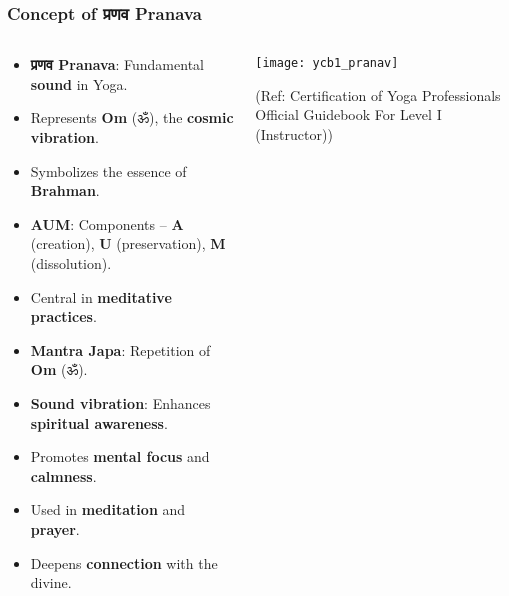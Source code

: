 \begin{frame}[fragile]\frametitle{Concept of प्रणव Pranava}
\begin{columns}
    \begin{column}[T]{0.7\linewidth}
      \begin{itemize}
        \item \textbf{प्रणव Pranava}: Fundamental \textbf{sound} in Yoga.
        \item Represents \textbf{Om} (ॐ), the \textbf{cosmic vibration}.
        \item Symbolizes the essence of \textbf{Brahman}.
        \item \textbf{AUM}: Components – \textbf{A} (creation), \textbf{U} (preservation), \textbf{M} (dissolution).
        \item Central in \textbf{meditative practices}.	  
        \item \textbf{Mantra Japa}: Repetition of \textbf{Om} (ॐ).
        \item \textbf{Sound vibration}: Enhances \textbf{spiritual awareness}.
        \item Promotes \textbf{mental focus} and \textbf{calmness}.
        \item Used in \textbf{meditation} and \textbf{prayer}.
        \item Deepens \textbf{connection} with the divine.
      \end{itemize}
    \end{column}
    \begin{column}[T]{0.3\linewidth}
        \begin{center}
        \texttt{[image: ycb1\_pranav]}

		{\tiny (Ref: Certification  of Yoga Professionals Official Guidebook For Level I (Instructor))}		
        \end{center}	
    \end{column}
\end{columns}
\end{frame}


